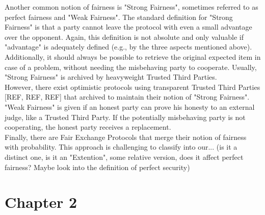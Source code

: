 \documentclass{cacthesis}
\begin{document}
        Another common notion of fairness is "Strong Fairness", sometimes referred to as perfect fairness and "Weak Fairness". The standard definition for "Strong Fairness" is that a party cannot leave the protocol with even a small advantage over the opponent. Again, this definition is not absolute and only valuable if "advantage" is adequately defined (e.g., by the three aspects mentioned above). Additionally, it should always be possible to retrieve the original expected item in case of a problem, without needing the misbehaving party to cooperate. Usually, "Strong Fairness" is archived by heavyweight Trusted Third Parties. \\ However, there exist optimistic protocols using transparent Trusted Third Parties [REF, REF, REF] that archived to maintain their notion of "Strong Fairness".
        "Weak Fairness" is given if an honest party can prove his honesty to an external judge, like a Trusted Third Party. If the potentially misbehaving party is not cooperating, the honest party receives a replacement. \\
        Finally, there are Fair Exchange Protocols that merge their notion of fairness with probability. This approach is challenging to classify into our... (is it a distinct one, is it an "Extention", some relative version, does it affect perfect fairness? Maybe look into the definition of perfect security)

		
	\chapter{Chapter 2}
	
	
	\appendix
\end{document}
